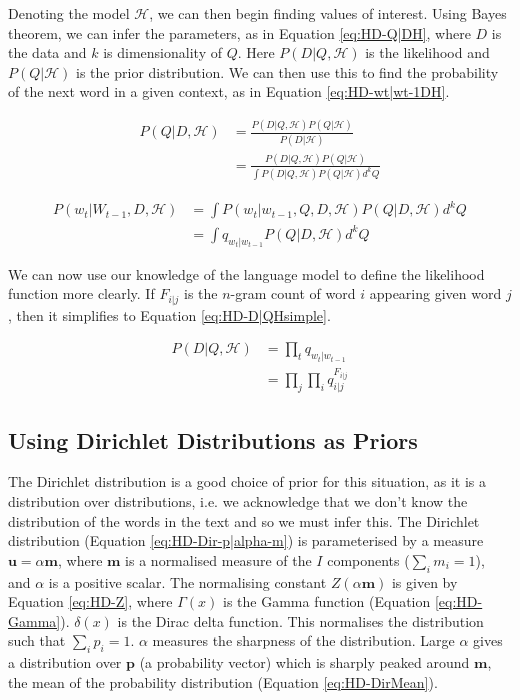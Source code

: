 Denoting the model $\mathscr{H}$, we can then begin finding values of interest. Using Bayes theorem, we can infer the parameters, as in Equation \ref{eq:HD-Q|DH}, where $D$ is the data and $k$ is dimensionality of $Q$. Here $P(D|Q,\mathscr{H})$ is the likelihood and $P(Q|\mathscr{H})$ is the prior distribution. We can then use this to find the probability of the next word in a given context, as in Equation \ref{eq:HD-wt|wt-1DH}.

\begin{align}
P(Q|D,\mathscr{H})&=\frac{P(D|Q,\mathscr{H})P(Q|\mathscr{H})}{P(D|\mathscr{H})} \nonumber
\\
&=\frac{P(D|Q,\mathscr{H})P(Q|\mathscr{H})}{\int P(D|Q,\mathscr{H})P(Q|\mathscr{H})d^{k}Q}
\label{eq:HD-Q|DH}
\end{align}

\begin{align}
P(w_{t}|W_{t-1},D,\mathscr{H})&=\int P(w_{t}|w_{t-1},Q,D,\mathscr{H})P(Q|D,\mathscr{H})d^{k}Q \nonumber
\\
&=\int q_{w_{t}|w_{t-1}}P(Q|D,\mathscr{H})d^{k}Q
\label{eq:HD-wt|wt-1DH}
\end{align}

We can now use our knowledge of the language model to define the likelihood function more clearly. If $F_{i|j}$ is the $n$-gram count of word $i$ appearing given word $j$, then it simplifies to Equation \ref{eq:HD-D|QHsimple}.

\begin{align}
P(D|Q,\mathscr{H})&=\prod_{t}q_{w_{t}|w_{t-1}} \nonumber
\\
&=\prod_{j}\prod_{i}q_{i|j}^{F_{i|j}}
\label{eq:HD-D|QHsimple}
\end{align}

\subsection{Using Dirichlet Distributions as Priors}

The Dirichlet distribution is a good choice of prior for this situation, as it is a distribution over distributions, i.e. we acknowledge that we don't know the distribution of the words in the text and so we must infer this. The Dirichlet distribution (Equation \ref{eq:HD-Dir-p|alpha-m}) is parameterised by a measure $\boldsymbol{u}=\alpha\boldsymbol{m}$, where $\boldsymbol{m}$ is a normalised measure of the $I$ components ($\sum_{i}m_{i}=1$), and $\alpha$ is a positive scalar. The normalising constant $Z(\alpha\boldsymbol{m})$ is given by Equation \ref{eq:HD-Z}, where $\Gamma(x)$ is the Gamma function (Equation \ref{eq:HD-Gamma}). $\delta(x)$ is the Dirac delta function. This normalises the distribution such that $\sum_{i}p_{i}=1$. $\alpha$ measures the sharpness of the distribution. Large $\alpha$ gives a distribution over $\boldsymbol{p}$ (a probability vector) which is sharply peaked around $\boldsymbol{m}$, the mean of the probability distribution (Equation \ref{eq:HD-DirMean}).

